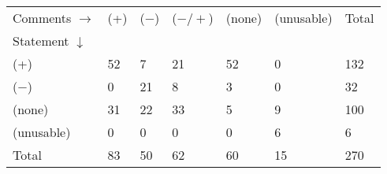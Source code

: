 \begin{tabular}{lllllll}
\hline
Comments $\rightarrow$ & (+) & ($-$) & ($-/+$) & (none) &(unusable) & Total \\
Statement $\downarrow$ & &&&&& \\
\hline
(+) & 52 & 7 & 21 & 52 & 0& 132\\
($-$) & 0 & 21 & 8 & 3 & 0& 32\\
(none) & 31 & 22 & 33 & 5 & 9& 100\\
(unusable) & 0 & 0 & 0 & 0 & 6& 6\\
Total & 83 & 50 & 62 & 60 & 15& 270\\
\hline
\end{tabular}
